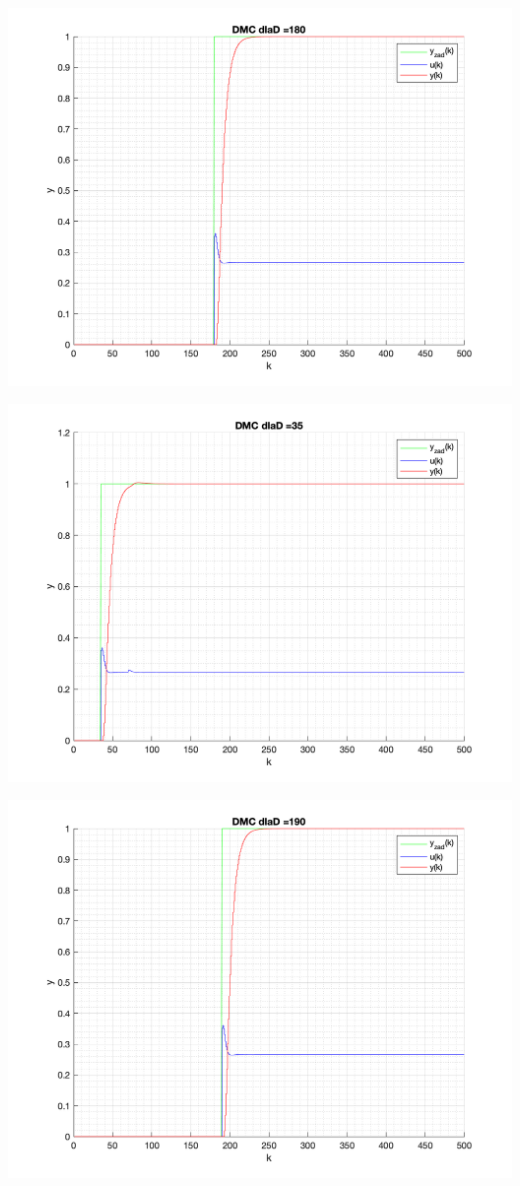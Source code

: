 \documentclass[a4paper, 11pt]{article}
\begin{document}
\begin{enumerate}
 \includegraphics[width=\linewidth]{./ModelsP4_D/P4_DMC_D_180_png.png} 
 
 \includegraphics[width=\linewidth]{./ModelsP4_D/P4_DMC_D_35_png.png} 
 
 \includegraphics[width=\linewidth]{./ModelsP4_D/P4_DMC_D_190_png.png} 
 

\end{enumerate}
\end{document}
